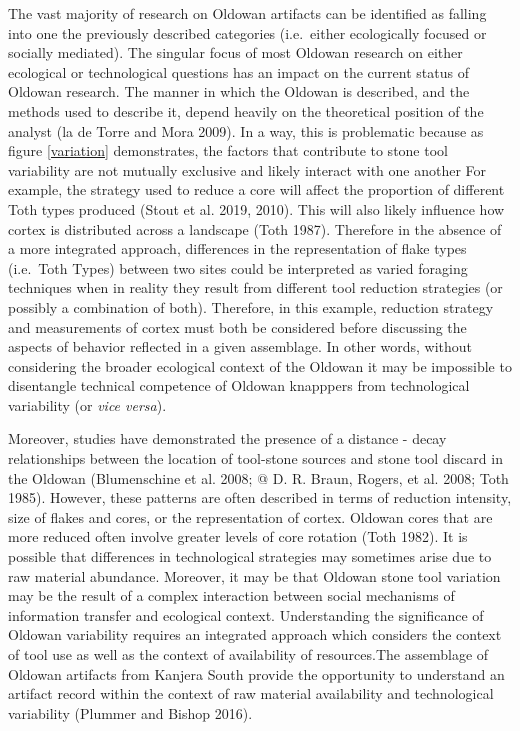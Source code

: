 \documentclass[]{elsarticle} %
\begin{document}
The vast majority of research on Oldowan artifacts can be identified as
falling into one the previously described categories (i.e.~either
ecologically focused or socially mediated). The singular focus of most
Oldowan research on either ecological or technological questions has an
impact on the current status of Oldowan research. The manner in which
the Oldowan is described, and the methods used to describe it, depend
heavily on the theoretical position of the analyst (la de Torre and Mora
2009). In a way, this is problematic because as figure \ref{variation}
demonstrates, the factors that contribute to stone tool variability are
not mutually exclusive and likely interact with one another For example,
the strategy used to reduce a core will affect the proportion of
different Toth types produced (Stout et al. 2019, 2010). This will also
likely influence how cortex is distributed across a landscape (Toth
1987). Therefore in the absence of a more integrated approach,
differences in the representation of flake types (i.e.~Toth Types)
between two sites could be interpreted as varied foraging techniques
when in reality they result from different tool reduction strategies (or
possibly a combination of both). Therefore, in this example, reduction
strategy and measurements of cortex must both be considered before
discussing the aspects of behavior reflected in a given assemblage. In
other words, without considering the broader ecological context of the
Oldowan it may be impossible to disentangle technical competence of
Oldowan knapppers from technological variability (or \emph{vice versa}).

Moreover, studies have demonstrated the presence of a distance - decay
relationships between the location of tool-stone sources and stone tool
discard in the Oldowan (Blumenschine et al. 2008; @ D. R. Braun, Rogers,
et al. 2008; Toth 1985). However, these patterns are often described in
terms of reduction intensity, size of flakes and cores, or the
representation of cortex. Oldowan cores that are more reduced often
involve greater levels of core rotation (Toth 1982). It is possible that
differences in technological strategies may sometimes arise due to raw
material abundance. Moreover, it may be that Oldowan stone tool
variation may be the result of a complex interaction between social
mechanisms of information transfer and ecological context. Understanding
the significance of Oldowan variability requires an integrated approach
which considers the context of tool use as well as the context of
availability of resources.The assemblage of Oldowan artifacts from
Kanjera South provide the opportunity to understand an artifact record
within the context of raw material availability and technological
variability (Plummer and Bishop 2016).
\end{document}
